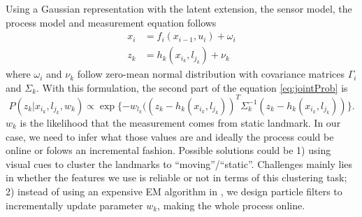 Using a Gaussian representation with the latent extension, the sensor
model, the process model and measurement equation follows
\begin{equation}
\begin{aligned}
x_i &= f_i(x_{i-1}, u_i) + \omega_i \\
z_k &= h_k(x_{i_k}, l_{j_k}) + \nu_k
\end{aligned}
\label{eq:gaussRepresentation}
\end{equation}
where $\omega_i$ and $\nu_k$ follow zero-mean normal distribution with covariance matrices $\Gamma_i$ and $\Sigma_k$. With this formulation, the second part of the equation \ref{eq:jointProb} is
\begin{equation}
P(z_k|x_{i_k}, l_{j_k}, w_k)\propto \exp\{-w_{l_k}((z_k - h_k(x_{i_k}, l_{j_k}))^T\Sigma_k^{-1}(z_k - h_k(x_{i_k}, l_{j_k}))\}.
\label{eq:sensor}
\end{equation}
$w_k$ is the likelihood that the measurement comes from static landmark. In our case, we need to infer what those values are and ideally the process could be online or folows an incremental fashion. Possible solutions could be 1) using visual cues to cluster the landmarks to ``moving''/``static''. Challenges mainly lies in whether the features we use is reliable or not in terms of this clustering task; 2) instead of using an expensive EM algorithm in \cite{rogers2010slam}, we design particle filters to incrementally update parameter $w_k$, making the whole process online.
